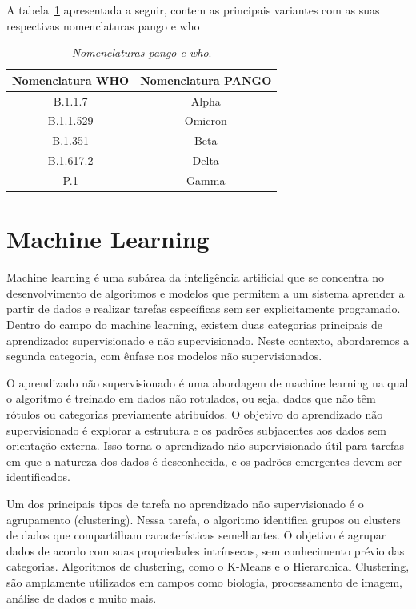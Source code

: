 A tabela~\ref{tab:nomenclaturaPangoWho} apresentada a seguir, contem as principais variantes com as suas respectivas nomenclaturas \gls{pango} e \gls{who}

\begin{table}[htb]
  \caption{\textit{Nomenclaturas \gls{pango} e \gls{who}}.}
  \begin{center}
    \begin{tabular}{|c|c|}
      \hline
      Nomenclatura WHO & Nomenclatura PANGO \\
      \hline
      B.1.1.7          & Alpha              \\
      B.1.1.529        & Omicron            \\
      B.1.351          & Beta               \\
      B.1.617.2        & Delta              \\
      P.1              & Gamma              \\
      \hline
    \end{tabular}
  \end{center}
  \label{tab:nomenclaturaPangoWho}
\end{table}

\section{Machine Learning}
Machine learning é uma subárea da inteligência artificial que se concentra no desenvolvimento de algoritmos e modelos que permitem a um sistema aprender a partir de dados e realizar tarefas específicas sem ser explicitamente programado. Dentro do campo do machine learning, existem duas categorias principais de aprendizado: supervisionado e não supervisionado. Neste contexto, abordaremos a segunda categoria, com ênfase nos modelos não supervisionados.

O aprendizado não supervisionado é uma abordagem de machine learning na qual o algoritmo é treinado em dados não rotulados, ou seja, dados que não têm rótulos ou categorias previamente atribuídos. O objetivo do aprendizado não supervisionado é explorar a estrutura e os padrões subjacentes aos dados sem orientação externa. Isso torna o aprendizado não supervisionado útil para tarefas em que a natureza dos dados é desconhecida, e os padrões emergentes devem ser identificados.

Um dos principais tipos de tarefa no aprendizado não supervisionado é o agrupamento (clustering). Nessa tarefa, o algoritmo identifica grupos ou clusters de dados que compartilham características semelhantes. O objetivo é agrupar dados de acordo com suas propriedades intrínsecas, sem conhecimento prévio das categorias. Algoritmos de clustering, como o K-Means e o Hierarchical Clustering, são amplamente utilizados em campos como biologia, processamento de imagem, análise de dados e muito mais.

